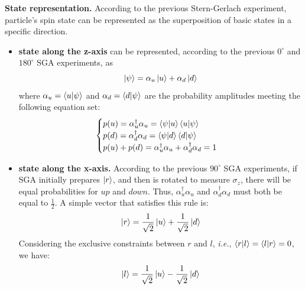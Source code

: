 \documentclass{easyclass}
\begin{document}
\textbf{State representation.} According to the previous Stern-Gerlach experiment, particle's spin state can be represented as the superposition of basic states in a specific direction. 
\begin{itemize}
	\item \textbf{state along the z-axis} can be represented, according to the previous $0^{\circ}$ and $180^{\circ}$ SGA experiments, as 
	 \begin{equation}
	 	\ket{\psi} = \alpha_u\ket{u} + \alpha_d\ket{d}
	 \end{equation}
 	 where $\alpha_u=\braket{u|\psi}$ and $\alpha_d=\braket{d|\psi}$ are the probability amplitudes meeting the following equation set:
 	 \begin{equation}
 	 	\begin{cases}
 			p(u)=\alpha_u^{\dagger}\alpha_u=\braket{\psi|u}\braket{u|\psi}\\
 			p(d)=\alpha_d^{\dagger}\alpha_d=\braket{\psi|d}\braket{d|\psi}\\
 			p(u)+p(d)=\alpha_u^{\dagger}\alpha_u+\alpha_d^{\dagger}\alpha_d=1
 	 	\end{cases}
 	 \end{equation}
  
  	\item \textbf{state along the x-axis.} According to the previous $90^{\circ}$ SGA experiments, if SGA initially prepares $\ket{r}$, and then is rotated to measure $\sigma_z$, there will be equal probabilities for $up$ and $down$. Thus, $\alpha_u^{\dagger}\alpha_u$ and $\alpha_d^{\dagger}\alpha_d$ must both be equal to $\frac{1}{2}$. A simple vector that satisfies this rule is:
  	\begin{equation}
  		\ket{r} = \frac{1}{\sqrt{2}}\ket{u} + \frac{1}{\sqrt{2}}\ket{d}
  	\end{equation}
  	Considering the exclusive constraints between $r$ and $l$, \textit{i.e.}, $\braket{r|l}=\braket{l|r}=0$, we have:
  	\begin{equation}
  		\ket{l} = \frac{1}{\sqrt{2}}\ket{u} - \frac{1}{\sqrt{2}}\ket{d}
  	\end{equation}
  

\end{itemize}
\end{document}

